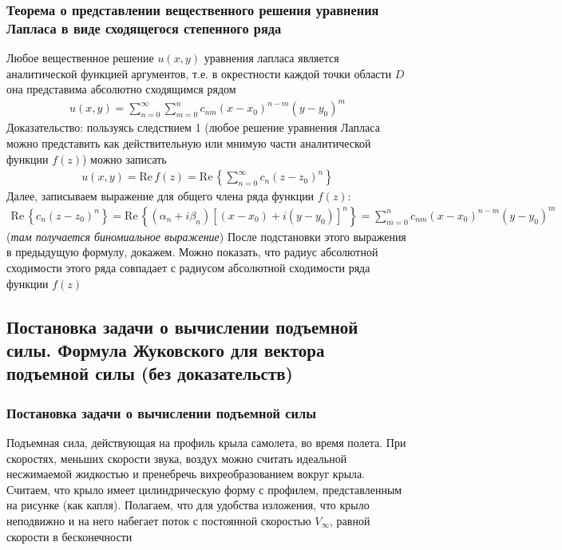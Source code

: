 \documentclass[12pt]{extarticle}
\newcommand{\RE}{\mathrm{Re}\,}
\begin{document}
\subsubsection{Теорема о представлении вещественного решения уравнения Лапласа
в виде сходящегося степенного ряда}
Любое вещественное решение $u(x,y)$ уравнения лапласа является
аналитической функцией аргументов, т.е. в окрестности каждой точки
области $D$ она представима абсолютно сходящимся рядом
\begin{eqnarray*}
    u(x,y)=\sum\limits_{n=0}^{\infty}\sum\limits_{m=0}^{n}
    c_{nm}(x-x_{0})^{n-m}(y-y_{0})^{m}
\end{eqnarray*}
Доказательство: пользуясь следствием 1 (любое решение уравнения Лапласа
можно представить как действительную или мнимую части аналитической
функции $f(z)$) можно записать
\begin{eqnarray*}
    u(x,y)=\RE{f(z)}=\RE\left\{\sum\limits_{n=0}^{\infty}c_{n}(z-z_{0})^{n}\right\}
\end{eqnarray*}
Далее, записываем выражение для общего члена ряда функции $f(z)$:
\begin{eqnarray*}
    \RE\left\{c_{n}(z-z_{0})^{n}\right\}
    =\RE\left\{(\alpha_{n}+i\beta_{n})[(x-x_{0})+i(y-y_{0})]^{n}\right\}
    =\sum\limits_{m=0}^{n}c_{nm}(x-x_{0})^{n-m}(y-y_{0})^{m}
\end{eqnarray*}
(\textit{там получается биномиальное выражение})
После подстановки этого выражения в предыдущую формулу, докажем. Можно
показать, что радиус абсолютной сходимости этого ряда совпадает с
радиусом абсолютной сходимости ряда функции $f(z)$

\subsection{Постановка задачи о вычислении подъемной силы. Формула
Жуковского для вектора подъемной силы (без доказательств)}
\subsubsection{Постановка задачи о вычислении подъемной силы}
Подъемная сила, действующая на профиль крыла самолета, во время полета.
При скоростях, меньших скорости звука, воздух можно считать идеальной
несжимаемой жидкостью и пренебречь вихреобразованием вокруг крыла.
Считаем, что крыло имеет цилиндрическую форму с профилем, представленным
на рисунке (как капля). Полагаем, что для удобства изложения, что крыло
неподвижно и на него набегает поток с постоянной скоростью $V_{\infty}$,
равной скорости в бесконечности
\end{document}
